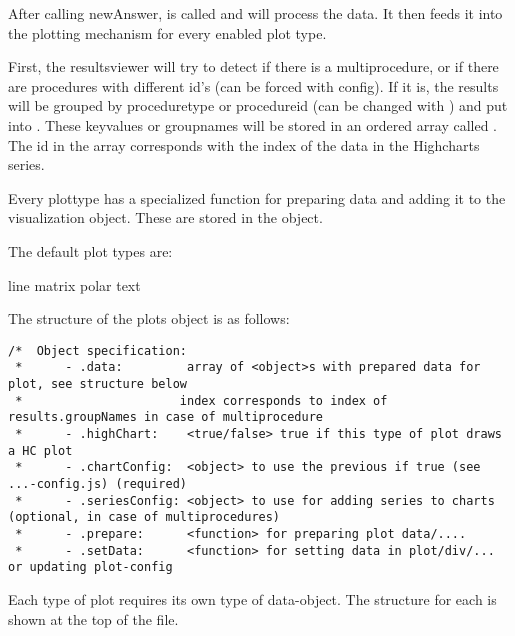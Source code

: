 After calling newAnswer,  is called and will process the data. It then feeds it into the plotting mechanism for every enabled plot type.

First, the resultsviewer will try to detect if there is a multiprocedure, or if there are procedures with different id's (can be forced with config). If it is, the results will be grouped by proceduretype or procedureid (can be changed with  ) and put into . These keyvalues or groupnames will be stored in an ordered array called . The id in the array corresponds with the index of the data in the Highcharts series.

Every plottype has a specialized function for preparing data and adding it to the visualization object. These are stored in the  object.

The default plot types are:

\begin{itemize}
line
matrix
polar
text
\end{itemize}

The structure of the plots object is as follows:

\begin{lstlisting}
/*  Object specification:
 *      - .data:         array of <object>s with prepared data for plot, see structure below
 *                      index corresponds to index of results.groupNames in case of multiprocedure
 *      - .highChart:    <true/false> true if this type of plot draws a HC plot
 *      - .chartConfig:  <object> to use the previous if true (see ...-config.js) (required)
 *      - .seriesConfig: <object> to use for adding series to charts (optional, in case of multiprocedures)
 *      - .prepare:      <function> for preparing plot data/....
 *      - .setData:      <function> for setting data in plot/div/... or updating plot-config
 \end{lstlisting}
 
Each type of plot requires its own type of data-object. The structure for each is shown at the top of the file.

